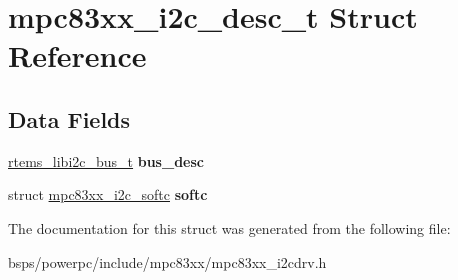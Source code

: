 \hypertarget{structmpc83xx__i2c__desc__t}{}\section{mpc83xx\+\_\+i2c\+\_\+desc\+\_\+t Struct Reference}
\label{structmpc83xx__i2c__desc__t}
\subsection*{Data Fields}
\begin{DoxyCompactItemize}
\item 
\mbox{\label{structmpc83xx__i2c__desc__t_acc41578e821a11a328158d06c7439a05}} 
\mbox{\hyperlink{structrtems__libi2c__bus__t__}{rtems\+\_\+libi2c\+\_\+bus\+\_\+t}} {\bfseries bus\+\_\+desc}
\item 
\mbox{\label{structmpc83xx__i2c__desc__t_ac1721c216c0bebafd1a974bd5c6ede96}} 
struct \mbox{\hyperlink{structmpc83xx__i2c__softc}{mpc83xx\+\_\+i2c\+\_\+softc}} {\bfseries softc}
\end{DoxyCompactItemize}


The documentation for this struct was generated from the following file\+:\begin{DoxyCompactItemize}
\item 
bsps/powerpc/include/mpc83xx/mpc83xx\+\_\+i2cdrv.\+h\end{DoxyCompactItemize}
